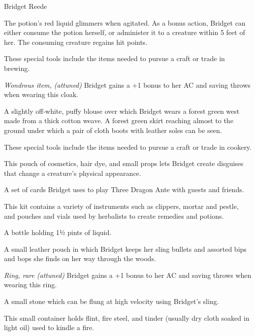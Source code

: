\begin{DndMonster}{Bridget Reede}
\begin{multicols}{2}
        The potion's red liquid glimmers when agitated.
        As a bonus action, Bridget can either consume the potion herself, or administer it to a creature within 5 feet of her.
        The consuming creature regains  hit points.


        These special tools include the items needed to pursue a craft or trade in brewing.

        \textit{Wondrous item, (attuned)}
        Bridget gains a +1 bonus to her AC and saving throws when wearing this cloak.

        A slightly off-white, puffy blouse over which Bridget wears a forest green west made from a thick cotton weave.
        A forest green skirt reaching almost to the ground under which a pair of cloth boots with leather soles can be seen.

        These special tools include the items needed to pursue a craft or trade in cookery.

        This pouch of cosmetics, hair dye, and small props lets Bridget create disguises that change a creature's physical appearance.

        A set of cards Bridget uses to play Three Dragon Ante with guests and friends.

        This kit contains a variety of instruments such as clippers, mortar and pestle, and pouches and vials used by herbalists to create remedies and potions.

        A bottle holding 1½ pints of liquid.

        A small leather pouch in which Bridget keeps her sling bullets and assorted bips and bops she finds on her way through the woods.

        \textit{Ring, rare (attuned)}
        Bridget gains a +1 bonus to her AC and saving throws when wearing this ring.

        A small stone which can be flung at high velocity using Bridget's sling.

        This small container holds flint, fire steel, and tinder (usually dry cloth soaked in light oil) used to kindle a fire.

    \end{multicols}
\end{DndMonster}